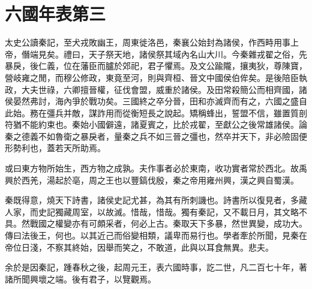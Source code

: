 \chapter{六國年表第三}

太史公讀秦記，至犬戎敗幽王，周東徙洛邑，秦襄公始封為諸侯，作西畤用事上帝，僭端見矣。禮曰，天子祭天地，諸侯祭其域內名山大川。今秦雜戎翟之俗，先暴戾，後仁義，位在藩臣而臚於郊祀，君子懼焉。及文公踰隴，攘夷狄，尊陳寶，營岐雍之閒，而穆公修政，東竟至河，則與齊桓、晉文中國侯伯侔矣。是後陪臣執政，大夫世祿，六卿擅晉權，征伐會盟，威重於諸侯。及田常殺簡公而相齊國，諸侯晏然弗討，海內爭於戰功矣。三國終之卒分晉，田和亦滅齊而有之，六國之盛自此始。務在彊兵并敵，謀詐用而從衡短長之說起。矯稱蜂出，誓盟不信，雖置質剖符猶不能約束也。秦始小國僻遠，諸夏賓之，比於戎翟，至獻公之後常雄諸侯。論秦之德義不如魯衛之暴戾者，量秦之兵不如三晉之彊也，然卒并天下，非必險固便形勢利也，蓋若天所助焉。
	
或曰東方物所始生，西方物之成孰。夫作事者必於東南，收功實者常於西北。故禹興於西羌，湯起於亳，周之王也以豐鎬伐殷，秦之帝用雍州興，漢之興自蜀漢。

秦既得意，燒天下詩書，諸侯史記尤甚，為其有所刺譏也。詩書所以復見者，多藏人家，而史記獨藏周室，以故滅。惜哉，惜哉。獨有秦記，又不載日月，其文略不具。然戰國之權變亦有可頗采者，何必上古。秦取天下多暴，然世異變，成功大。傳曰法後王，何也。以其近己而俗變相類，議卑而易行也。學者牽於所聞，見秦在帝位日淺，不察其終始，因舉而笑之，不敢道，此與以耳食無異。悲夫。

余於是因秦記，踵春秋之後，起周元王，表六國時事，訖二世，凡二百七十年，著諸所聞興壞之端。後有君子，以覽觀焉。

